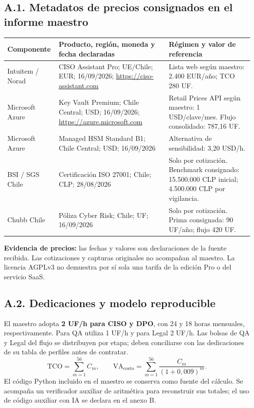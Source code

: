\subsection{A.1. Metadatos de precios consignados en el informe maestro}
\begin{center}\footnotesize\renewcommand{\arraystretch}{1.25}
\begin{tabularx}{\linewidth}{@{}p{3cm}Xp{3.5cm}@{}}
\toprule\textbf{Componente} & \textbf{Producto, región, moneda y fecha declaradas} & \textbf{Régimen y valor de referencia}\\\midrule
Intuitem / Norad & CISO Assistant Pro; UE/Chile; EUR; 16/09/2026; \url{https://ciso-assistant.com} & Lista web según maestro: 2.400 EUR/año; TCO 280 UF.\\
Microsoft Azure & Key Vault Premium; Chile Central; USD; 16/09/2026; \url{https://azure.microsoft.com} & Retail Prices API según maestro: 1 USD/clave/mes. Flujo consolidado: 787,16 UF.\\
Microsoft Azure & Managed HSM Standard B1; Chile Central; USD; 16/09/2026 & Alternativa de sensibilidad: 3,20 USD/h.\\
BSI / SGS Chile & Certificación ISO 27001; Chile; CLP; 28/08/2026 & Solo por cotización. Benchmark consignado: 15.500.000 CLP inicial; 4.500.000 CLP por vigilancia.\\
Chubb Chile & Póliza Cyber Risk; Chile; UF; 16/09/2026 & Solo por cotización. Prima consignada: 90 UF/año; flujo 420 UF.\\\bottomrule
\end{tabularx}\end{center}
\textbf{Evidencia de precios:} las fechas y valores son declaraciones de la fuente recibida. Las cotizaciones y capturas originales no acompañan al maestro. La licencia AGPLv3 no demuestra por sí sola una tarifa de la edición Pro o del servicio SaaS.

\subsection{A.2. Dedicaciones y modelo reproducible}
El maestro adopta \textbf{2 UF/h para CISO y DPO}, con 24 y 18 horas mensuales, respectivamente. Para QA utiliza 1 UF/h y para Legal 2 UF/h. Las bolsas de QA y Legal del flujo se distribuyen por etapa; deben conciliarse con las dedicaciones de su tabla de perfiles antes de contratar.
\[
\mathrm{TCO}=\sum_{m=1}^{56}C_m,\qquad
\mathrm{VA}_{\mathrm{costo}}=\sum_{m=1}^{56}\frac{C_m}{(1+0,009)^m}.
\]
El código Python incluido en el maestro se conserva como fuente del cálculo. Se acompaña un verificador auxiliar de aritmética para reconstruir sus totales; el uso de código auxiliar con IA se declara en el anexo B.

